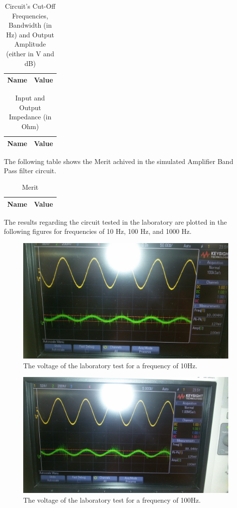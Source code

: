 \begin{table}[H]
\centering
\begin{tabular}{|l|l|}
\hline
{\bf Name} & {\bf Value} \\ \hline
    
\end{tabular}
\caption{Circuit's Cut-Off Frequencies, Bandwidth (in Hz) and Output Amplitude (either in V and dB)}
\end{table}

\begin{table}[H]
\centering
\begin{tabular}{|l|l|}
\hline
{\bf Name} & {\bf Value} \\ \hline
    
    
\end{tabular}
\caption{Input and Output Impedance (in Ohm)}
\end{table}

The following table shows the Merit achived in the simulated Amplifier Band Pass filter circuit.

\begin{table}[H]
\centering
\begin{tabular}{|l|l|}
\hline
{\bf Name} & {\bf Value} \\ \hline
    
\end{tabular}
\caption{Merit}
\end{table}

The results regarding the circuit tested in the laboratory are plotted in the following figures for frequencies of 10 Hz, 100 Hz, and 1000 Hz.

\begin{figure}[h] 
\centering
\includegraphics[width=0.6\linewidth]{10Hz.jpeg}
\caption{The voltage of the laboratory test for a frequency of 10Hz.}
\label{Fig9: 10Hz}
\end{figure}

\begin{figure}[h] 
\centering
\includegraphics[width=0.6\linewidth]{100Hz.jpeg}
\caption{The voltage of the laboratory test for a frequency of 100Hz.}
\label{Fig10: 100Hz}
\end{figure}

